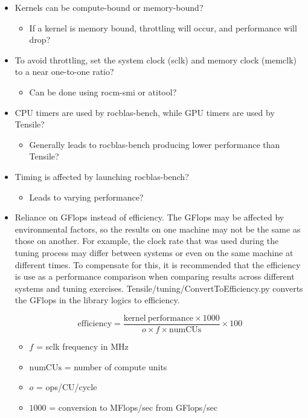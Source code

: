 \documentclass[]{article}
\begin{document}
\begin{itemize}

\item Kernels can be compute-bound or memory-bound?

 \begin{itemize}
 	\item If a kernel is memory bound, throttling will occur, and performance will drop?
 \end{itemize}

\item To avoid throttling, set the system clock (sclk) and memory clock (memclk) to a near one-to-one ratio?

  \begin{itemize}
  	\item Can be done using rocm-smi or atitool?
  \end{itemize}

\item CPU timers are used by rocblas-bench, while GPU timers are used by Tensile?

  \begin{itemize}
   	\item Generally leads to rocblas-bench producing lower performance than Tensile?
  \end{itemize}

\item Timing is affected by launching rocblas-bench?

  \begin{itemize}
  	\item Leads to varying performance?
  \end{itemize}

\item \label{sec:efficiency} Reliance on GFlops instead of efficiency. The GFlops may be affected by environmental factors, so the results on one machine may not be the same as those on another. For example, the clock rate that was used during the tuning process may differ between systems or even on the same machine at different times. To compensate for this, it is recommended that the efficiency is use as a performance comparison when comparing results across different systems and tuning exercises. Tensile/tuning/ConvertToEfficiency.py converts the GFlops in the library logics to efficiency.

$$ \mathrm{efficiency} = \frac{\mathrm{kernel\ performance} \times 1000}{o \times f \times \mathrm{numCUs}} \times 100 $$

\begin{itemize}
	\item $f$ = sclk frequency in MHz
	\item $\mathrm{numCUs}$ = number of compute units
	\item $o$ = ops/CU/cycle
	\item $1000$ = conversion to MFlops/sec from GFlops/sec
\end{itemize}

\end{itemize}
\end{document}
